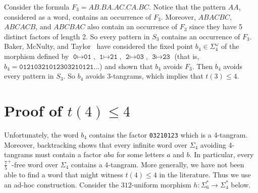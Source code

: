 \documentclass[final]{dmtcs-episciences}
\renewcommand{\le}{\leqslant}
\theoremstyle{plain}
\theoremstyle{definition}
\theoremstyle{remark}
\begin{document}
Consider the formula $F_3=AB.BA.AC.CA.BC$. Notice that the pattern $AA$, considered as a word, contains an occurrence of $F_3$.
Moreover, $ABACBC$, $ABCACB$, and $ABCBAC$ also contain an occurrence of $F_3$
since they have 5 distinct factors of length 2.
So every pattern in $S_3$ contains an occurrence of $F_3$.
Baker, McNulty, and Taylor~\cite{Baker(1989)} have considered the fixed point $b_4\in\Sigma_4^\omega$ of the morphism defined by
$\texttt{0}\mapsto\texttt{01}$, $\texttt{1}\mapsto\texttt{21}$, $\texttt{2}\mapsto\texttt{03}$, $\texttt{3}\mapsto\texttt{23}$
(that is, $b_4=\texttt{01210321012303210121}\ldots$) and shown that $b_4$ avoids $F_3$.
Then $b_4$ avoids every pattern in $S_3$. So $b_4$ avoids 3-tangrams, which implies that $t(3)\le4$.

\section{Proof of $t(4)\le 4$}\label{t_4}
Unfortunately, the word $b_4$ contains the factor \texttt{03210123} which is a 4-tangram.
Moreover, backtracking shows that every infinite word over $\Sigma_4$ avoiding 4-tangrams
must contain a factor $aba$ for some letters $a$ and $b$.
In particular, every $\tfrac75^+$-free word over $\Sigma_4$ contains a 4-tangram.
More generally, we have not been able to find a word that might witness $t(4)\le 4$ in the literature.
Thus we use an ad-hoc construction.
Consider the $312$-uniform morphism $h:\Sigma_6^*\to\Sigma_4^*$ below.
\end{document}
